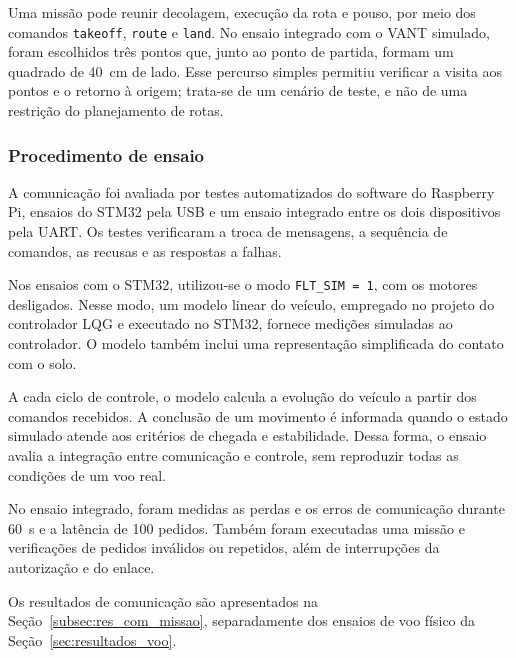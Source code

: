 Uma missão pode reunir decolagem, execução da rota e pouso, por meio dos comandos \texttt{takeoff}, \texttt{route} e \texttt{land}. No ensaio integrado com o VANT simulado, foram escolhidos três pontos que, junto ao ponto de partida, formam um quadrado de 40~cm de lado. Esse percurso simples permitiu verificar a visita aos pontos e o retorno à origem; trata-se de um cenário de teste, e não de uma restrição do planejamento de rotas.

\subsubsection{Procedimento de ensaio}\label{subsubsec:com_ensaios}

A comunicação foi avaliada por testes automatizados do software do Raspberry Pi, ensaios do STM32 pela USB e um ensaio integrado entre os dois dispositivos pela UART. Os testes verificaram a troca de mensagens, a sequência de comandos, as recusas e as respostas a falhas.

Nos ensaios com o STM32, utilizou-se o modo \texttt{FLT\_SIM = 1}, com os motores desligados. Nesse modo, um modelo linear do veículo, empregado no projeto do controlador LQG e executado no STM32, fornece medições simuladas ao controlador. O modelo também inclui uma representação simplificada do contato com o solo.

A cada ciclo de controle, o modelo calcula a evolução do veículo a partir dos comandos recebidos. A conclusão de um movimento é informada quando o estado simulado atende aos critérios de chegada e estabilidade. Dessa forma, o ensaio avalia a integração entre comunicação e controle, sem reproduzir todas as condições de um voo real.

No ensaio integrado, foram medidas as perdas e os erros de comunicação durante 60~s e a latência de 100 pedidos. Também foram executadas uma missão e verificações de pedidos inválidos ou repetidos, além de interrupções da autorização e do enlace.

Os resultados de comunicação são apresentados na Seção~\ref{subsec:res_com_missao}, separadamente dos ensaios de voo físico da Seção~\ref{sec:resultados_voo}.
